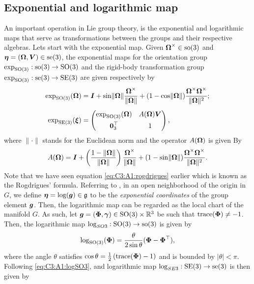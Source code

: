 \subsection{Exponential and logarithmic map}
An important operation in Lie group theory, is the exponential and logarithmic maps that serve as transformations between the groups and their respective algebras. Lets start with the exponential map. Given $\boldsymbol{\Omega}^\times\in \textup{\textrm{so}}(3)$ and ${\boldsymbol{\eta}} = (\boldsymbol{\Omega},{\boldsymbol{V}}) \in \textup{\textrm{se}}(3)$, the exponential maps for the orientation group $\exp_{\textup{\textrm{SO}}(3)}: \textup{\textrm{so}}(3) \to \textup{\textrm{SO}}(3)$ and the rigid-body transformation group $\exp_{\textup{\textrm{SO}}(3)}: \textup{\textrm{se}}(3) \to \textup{\textrm{SE}}(3)$ are given respectively by
%
\begin{align}
\exp_{\textup{\textrm{SO}}(3)}(\boldsymbol{\Omega}) & = {\boldsymbol{I}} + \sin \lVert \boldsymbol{\Omega} \rVert\frac{\boldsymbol{\Omega}^\times}{\lVert \boldsymbol{\Omega} \rVert} + (1 - \cos \lVert \boldsymbol{\Omega} \rVert) \frac{ \boldsymbol{\Omega}^\times \boldsymbol{\Omega}^\times }{\lVert \boldsymbol{\Omega} \rVert^2}; \label{eq:C3:A1:rogdrigues} \\[0.45em]
\exp_{\textup{\textrm{SE}}(3)}({\boldsymbol{\xi}}) & =
\begin{pmatrix}
\exp_{\textup{\textrm{SO}}(3)}(\boldsymbol{\Omega}) & A(\boldsymbol{\Omega}) {\boldsymbol{V}} \\[0.45em]\boldsymbol{0}_3^\top & 1
\end{pmatrix},
\end{align}
%
where $\lVert \cdot \rVert$ stands for the Euclidean norm and the operator $A(\boldsymbol{\Omega})$ is given By
%
\begin{equation}
A(\boldsymbol{\Omega}) = {\boldsymbol{I}} + \left(\frac{1 - \lVert \boldsymbol{\Omega} \rVert}{\lVert \boldsymbol{\Omega} \rVert}\right) \frac{\boldsymbol{\Omega}^\times}{\lVert \boldsymbol{\Omega} \rVert} + (1 - \sin \lVert \boldsymbol{\Omega} \rVert) \frac{ \boldsymbol{\Omega}^\times \boldsymbol{\Omega}^\times }{\lVert \boldsymbol{\Omega} \rVert^2}.
\end{equation}
%
Note that we have seen equation \eqref{eq:C3:A1:rogdrigues} earlier which is known as the Rogdrigues' formula. Referring to \cite{Bullo1995}, in an open neighborhood of the origin in $G$, we define ${\boldsymbol{\eta}} = \log({\boldsymbol{g}}) \in \mathfrak{g}$ to be the \emph{exponential coordinates} of the group element ${\boldsymbol{g}}$. 
Then, the logarithmic map can be regarded as the local chart of the manifold $G$. 
As such, let ${\boldsymbol{g}} = ({\boldsymbol{\Phi}}, {\boldsymbol{\gamma}}) \in \textup{\textrm{SO}}(3) \times \mathbb{R}^3$ be such that $\text{trace}({\boldsymbol{\Phi}}) \neq -1$. Then, the logarithmic map $\log_{SO{3}}: \textup{\textrm{SO}}(3) \to \textup{\textrm{so}}(3)$ is given by
%
\begin{equation}
  \log_{\textup{\textrm{SO}}(3)}({\boldsymbol{\Phi}}) = \frac{\theta}{2\sin\theta}({\boldsymbol{\Phi}} - {\boldsymbol{\Phi}}^\top), 
  \label{eq:C3:A1:logSO3} 
\end{equation}
%
where the angle $\theta$ satisfies $\cos \theta = \frac{1}{2} \left(\text{trace}({\boldsymbol{\Phi}})- 1 \right)$ and is bounded by $|\theta| < \pi$. Following \eqref{eq:C3:A1:logSO3}, and logarithmic map $\log_{SE{3}}: \textup{\textrm{SE}}(3) \to \textup{\textrm{se}}(3)$ is then given by
